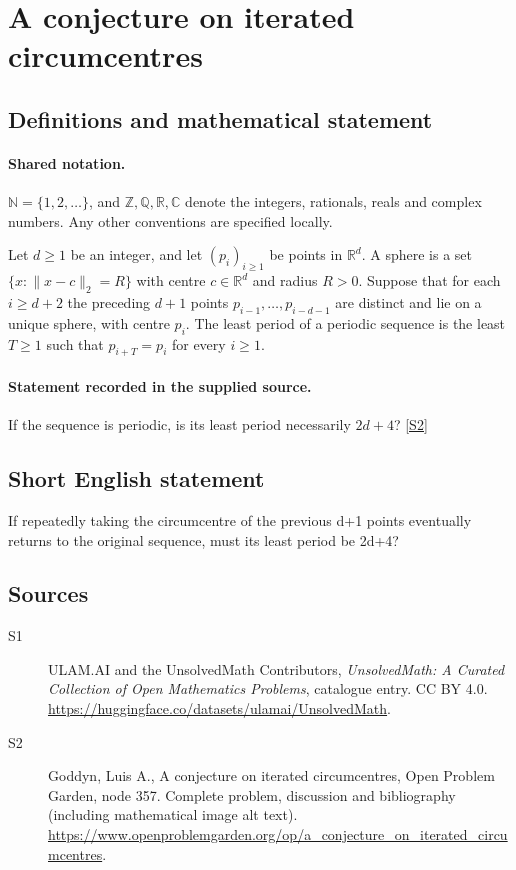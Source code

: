 \documentclass[11pt]{book}
\newcommand{\sref}[2]{\hyperlink{source:#1:#2}{[S#2]}}
\begin{document}
\section{A conjecture on iterated circumcentres}\label{statement}

\subsection{Definitions and mathematical statement}

\paragraph{Shared notation.}$\mathbb N=\{1,2,\ldots\}$, and $\mathbb Z,\mathbb Q,\mathbb R,\mathbb C$ denote the integers, rationals, reals and complex numbers. Any other conventions are specified locally.


Let $d\geq1$ be an integer, and let $(p_i)_{i\geq1}$ be points in $\mathbb R^d$. A sphere is a set $\{x:\|x-c\|_2=R\}$ with centre $c\in\mathbb R^d$ and radius $R>0$. Suppose that for each $i\geq d+2$ the preceding $d+1$ points $p_{i-1},\ldots,p_{i-d-1}$ are distinct and lie on a unique sphere, with centre $p_i$. The least period of a periodic sequence is the least $T\geq1$ such that $p_{i+T}=p_i$ for every $i\geq1$.
\paragraph{Statement recorded in the supplied source.}
If the sequence is periodic, is its least period necessarily $2d+4$? \sref{statement}{2}
\subsection{Short English statement}
If repeatedly taking the circumcentre of the previous d+1 points eventually returns to the original sequence, must its least period be 2d+4?
\subsection{Sources}
\begin{description}
\item[\hypertarget{source:statement:1}{S1}] ULAM.AI and the UnsolvedMath Contributors, \emph{UnsolvedMath: A Curated Collection of Open Mathematics Problems}, catalogue entry. CC BY 4.0. \url{https://huggingface.co/datasets/ulamai/UnsolvedMath}.
\item[\hypertarget{source:statement:2}{S2}] Goddyn, Luis A., A conjecture on iterated circumcentres, Open Problem Garden, node 357. Complete problem, discussion and bibliography (including mathematical image alt text). \url{https://www.openproblemgarden.org/op/a_conjecture_on_iterated_circumcentres}.
\end{description}
\label{end:statement}
\end{document}
